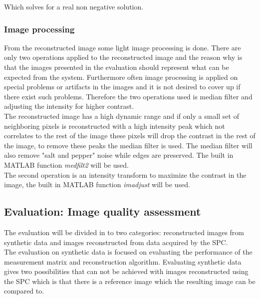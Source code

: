 Which solves for a real non negative solution. 


\subsubsection{Image processing}
From the reconstructed image some light image processing is done. There are only two operations applied to the reconstructed image and the reason why is that the images presented in the evaluation should represent what can be expected from the system. Furthermore often image processing is applied on special problems or artifacts in the images and it is not desired to cover up if there exist such problems. Therefore the two operations used is median filter and adjusting the intensity for higher contrast.\\[0.1in]

The reconstructed image has a high dynamic range and if only a small set of neighboring pixels is reconstructed with a high intensity peak which not correlates to the rest of the image these pixels will drop the contrast in the rest of the image, to remove these peaks the median filter is used. The median filter will also remove "salt and pepper" noise while edges are preserved. The built in MATLAB function \textit{medfilt2} will be used.\\[0.1in]

The second operation is an intensity transform to maximize the contrast in the image, the built in MATLAB function \textit{imadjust} will be used.   


\subsection{Evaluation: Image quality assessment}
The evaluation will be divided in to two categories: reconstructed images from synthetic data and images reconstructed from data acquired by the SPC.\\[0.1in] 

The evaluation on synthetic data is focused on evaluating the performance of the measurement matrix and reconstruction algorithm. Evaluating synthetic data gives two possibilities that can not be achieved with images reconstructed using the SPC which is that there is a reference image which the resulting image can be compared to.

